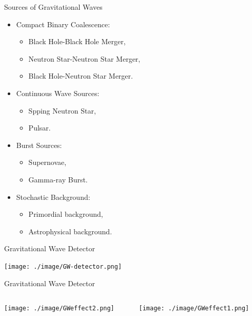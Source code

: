 \documentclass[xcolor=dvipsnames]{beamer}
\begin{document}
\begin{frame}[t]{Sources of Gravitational Waves}
  \begin{itemize}
    \item Compact Binary Coalescence:
    \begin{itemize}
      \item Black Hole-Black Hole Merger,
      \item Neutron Star-Neutron Star Merger,
      \item Black Hole-Neutron Star Merger.
    \end{itemize}
    \item Continuous Wave Sources:
    \begin{itemize}
      \item Spping Neutron Star,
      \item Pulsar.
    \end{itemize}
    \item Burst Sources:
    \begin{itemize}
      \item Supernovae,
      \item Gamma-ray Burst.
    \end{itemize}
    \item Stochastic Background:
    \begin{itemize}
      \item Primordial background,
      \item Astrophysical background.
    \end{itemize}
  \end{itemize}
\end{frame}

\begin{frame}[t]{Gravitational Wave Detector}
  \begin{center}
    \texttt{[image: ./image/GW-detector.png]}
  \end{center}
\end{frame}

\begin{frame}[t]{Gravitational Wave Detector}
  \begin{columns}
    \begin{column}{0.5\textwidth}
      \begin{center}
        \texttt{[image: ./image/GWeffect2.png]}
      \end{center}
    \end{column}
    \begin{column}{0.5\textwidth}
      \begin{center}
        \texttt{[image: ./image/GWeffect1.png]}
      \end{center}
    \end{column}
  \end{columns}
\end{frame}
\end{document}
